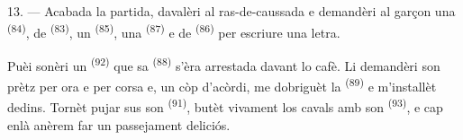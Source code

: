 13. --- Acabada la partida, davalèri al ras-de-caussada e demandèri al garçon una
 \textsuperscript{(84)}, de 
\textsuperscript{(83)}, un  \textsuperscript{(85)}, una
 \textsuperscript{(87)} e de  \textsuperscript{(86)}
per escriure una letra.

Puèi sonèri un  \textsuperscript{(92)} que sa 
\textsuperscript{(88)} s'èra arrestada davant lo cafè. Li demandèri son prètz per
ora e per corsa e, un còp d'acòrdi, me dobriguèt la 
\textsuperscript{(89)} e m'installèt dedins. Tornèt pujar sus son 
\textsuperscript{(91)}, butèt vivament los cavals amb son 
\textsuperscript{(93)}, e cap enlà anèrem far un passejament deliciós.
\VUsaut{6.0mm}
\VUfilet{22mm}
